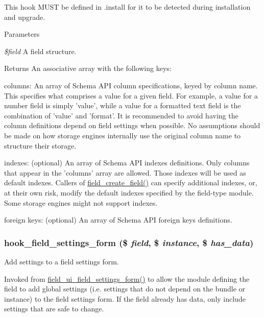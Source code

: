 This hook MUST be defined in .install for it to be detected during installation and upgrade.


\begin{DoxyParams}{Parameters}
\item[{\em \$field}]A field structure.\end{DoxyParams}
\begin{DoxyReturn}{Returns}
An associative array with the following keys:
\begin{DoxyItemize}
\item columns: An array of Schema API column specifications, keyed by column name. This specifies what comprises a value for a given field. For example, a value for a number field is simply 'value', while a value for a formatted text field is the combination of 'value' and 'format'. It is recommended to avoid having the column definitions depend on field settings when possible. No assumptions should be made on how storage engines internally use the original column name to structure their storage.
\item indexes: (optional) An array of Schema API indexes definitions. Only columns that appear in the 'columns' array are allowed. Those indexes will be used as default indexes. Callers of \hyperlink{group__field__crud_ga0f879889d2da2b5d638252d7eb027746}{field\_\-create\_\-field()} can specify additional indexes, or, at their own risk, modify the default indexes specified by the field-\/type module. Some storage engines might not support indexes.
\item foreign keys: (optional) An array of Schema API foreign keys definitions. 
\end{DoxyItemize}
\end{DoxyReturn}
\hypertarget{group__field__types_gab8a2ed808857cc6f3cb661fbc99d30d4}{
\subsubsection[{hook\_\-field\_\-settings\_\-form}]{\setlength{\rightskip}{0pt plus 5cm}hook\_\-field\_\-settings\_\-form (\$ {\em field}, \/  \$ {\em instance}, \/  \$ {\em has\_\-data})}}
\label{group__field__types_gab8a2ed808857cc6f3cb661fbc99d30d4}
Add settings to a field settings form.

Invoked from \hyperlink{group__forms_gaf347f488d97997991b92aae7060a10f2}{field\_\-ui\_\-field\_\-settings\_\-form()} to allow the module defining the field to add global settings (i.e. settings that do not depend on the bundle or instance) to the field settings form. If the field already has data, only include settings that are safe to change.

